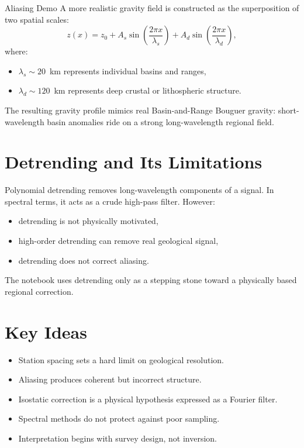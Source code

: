 \begin{activity}{Aliasing Demo}
A more realistic gravity field is constructed as the superposition of
two spatial scales:
\begin{equation}
z(x) = z_0
+ A_s \sin\!\left(\frac{2\pi x}{\lambda_s}\right)
+ A_d \sin\!\left(\frac{2\pi x}{\lambda_d}\right),
\end{equation}
where:
\begin{itemize}
  \item $\lambda_s \sim 20$~km represents individual basins and ranges,
  \item $\lambda_d \sim 120$~km represents deep crustal or lithospheric structure.
\end{itemize}

The resulting gravity profile mimics real Basin-and-Range Bouguer gravity:
short-wavelength basin anomalies ride on a strong long-wavelength regional field.

\section*{Detrending and Its Limitations}

Polynomial detrending removes long-wavelength components of a signal.
In spectral terms, it acts as a crude high-pass filter.
However:
\begin{itemize}
  \item detrending is not physically motivated,
  \item high-order detrending can remove real geological signal,
  \item detrending does not correct aliasing.
\end{itemize}

The notebook uses detrending only as a stepping stone toward a physically based
regional correction.


\section*{Key Ideas}

\begin{itemize}
  \item Station spacing sets a hard limit on geological resolution.
  \item Aliasing produces coherent but incorrect structure.
  \item Isostatic correction is a physical hypothesis expressed as a Fourier filter.
  \item Spectral methods do not protect against poor sampling.
  \item Interpretation begins with survey design, not inversion.
\end{itemize}

\end{activity}